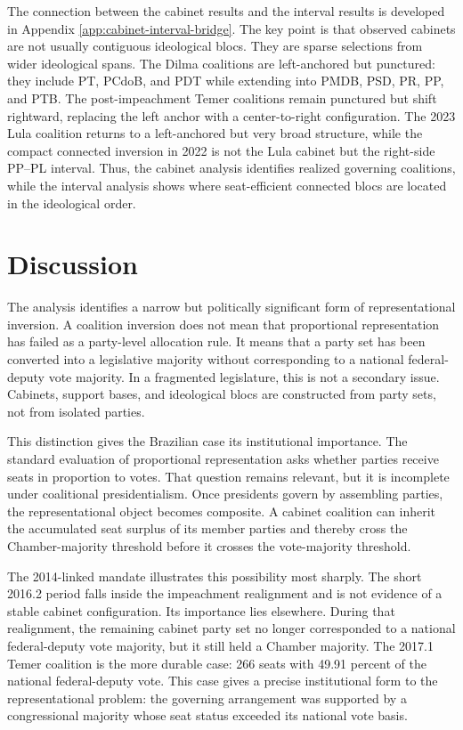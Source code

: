 \documentclass[11pt]{article}
\begin{document}
The connection between the cabinet results and the interval results is developed
in Appendix \ref{app:cabinet-interval-bridge}. The key point is that observed
cabinets are not usually contiguous ideological blocs. They are sparse selections
from wider ideological spans. The Dilma coalitions are left-anchored but
punctured: they include PT, PCdoB, and PDT while extending into PMDB, PSD,
PR, PP, and PTB. The post-impeachment Temer coalitions remain punctured but
shift rightward, replacing the left anchor with a center-to-right configuration.
The 2023 Lula coalition returns to a left-anchored but very broad structure,
while the compact connected inversion in 2022 is not the Lula cabinet but the
right-side PP--PL interval. Thus, the cabinet analysis identifies realized
governing coalitions, while the interval analysis shows where seat-efficient
connected blocs are located in the ideological order.

\section{Discussion}
\label{sec:disc}

The analysis identifies a narrow but politically significant form of
representational inversion. A coalition inversion does not mean that proportional
representation has failed as a party-level allocation rule. It means that a party
set has been converted into a legislative majority without corresponding to a
national federal-deputy vote majority. In a fragmented legislature, this is not a
secondary issue. Cabinets, support bases, and ideological blocs are constructed
from party sets, not from isolated parties.

This distinction gives the Brazilian case its institutional importance. The
standard evaluation of proportional representation asks whether parties receive
seats in proportion to votes. That question remains relevant, but it is incomplete
under coalitional presidentialism. Once presidents govern by assembling parties,
the representational object becomes composite. A cabinet coalition can inherit
the accumulated seat surplus of its member parties and thereby cross the
Chamber-majority threshold before it crosses the vote-majority threshold. 

The 2014-linked mandate illustrates this possibility most sharply. The short
2016.2 period falls inside the impeachment realignment and is not evidence of a
stable cabinet configuration. Its importance lies elsewhere. During that
realignment, the remaining cabinet party set no longer corresponded to a
national federal-deputy vote majority, but it still held a Chamber majority.
The 2017.1 Temer coalition is the more durable case: 266 seats with 49.91
percent of the national federal-deputy vote. This case gives a precise
institutional form to the representational problem: the governing arrangement
was supported by a congressional majority whose seat status exceeded its
national vote basis.
\end{document}
